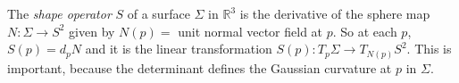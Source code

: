 \documentclass[12pt]{article}
\begin{document}
The \emph{shape operator} $S$ of a surface $\Sigma$ in ${\mathbb{R}}^3$ is the derivative of the sphere map $N:\Sigma\to S^2$ given by $N(p)=$ unit normal vector field at $p$. So at each $p$, $S(p)=d_pN$ and it is the linear transformation $S(p):T_p\Sigma\to T_{N(p)}S^2$.  This is important, because the determinant defines the Gaussian curvature at $p$ in $\Sigma$.
\end{document}
